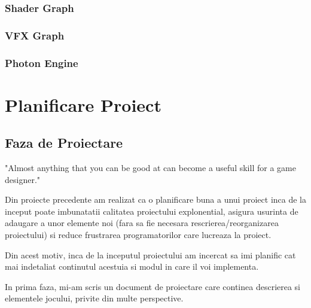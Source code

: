 \documentclass[12pt, a4paper]{article}
\begin{document}
	
	
	\subsubsection{Shader Graph}
	
	
	
	
	
	\subsubsection{VFX Graph}
	
	
	
	
	
	\subsubsection{Photon Engine}
	
	
	
	
	
	\section{Planificare Proiect}
	
	
	
	
	
	\subsection{Faza de Proiectare}
	
	"Almost anything that you can be good at can become a useful
	skill for a game designer." \cite{bookOfLenses}
	\newline
	
	Din proiecte precedente am realizat ca o planificare buna a unui proiect inca de la inceput poate imbunatatii calitatea proiectului explonential, asigura usurinta de adaugare a unor elemente noi (fara sa fie necesara rescrierea/reorganizarea proiectului) si reduce frustrarea programatorilor care lucreaza la proiect.
	\newline
	
	Din acest motiv, inca de la inceputul proiectului am incercat sa imi planific cat mai indetaliat continutul acestuia si modul in care il voi implementa.
	\newline
	
	In prima faza, mi-am scris un document de proiectare care continea descrierea si elementele jocului, privite din multe perspective.
	\newline
	
\end{document}
